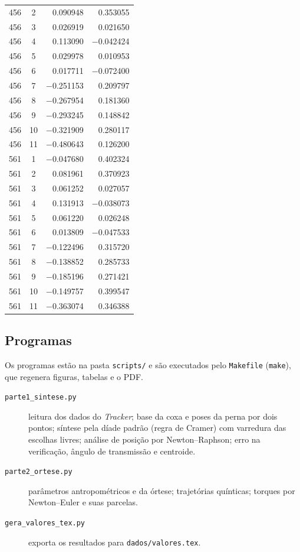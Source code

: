 \documentclass[12pt,a4paper,twoside]{article}
\numberwithin{equation}{section}
\begin{document}
{\begin{longtable}{cc rr}
    456 & 2 & 0.090948 & 0.353055 \\
    456 & 3 & 0.026919 & 0.021650 \\
    456 & 4 & 0.113090 & \ensuremath{-}0.042424 \\
    456 & 5 & 0.029978 & 0.010953 \\
    456 & 6 & 0.017711 & \ensuremath{-}0.072400 \\
    456 & 7 & \ensuremath{-}0.251153 & 0.209797 \\
    456 & 8 & \ensuremath{-}0.267954 & 0.181360 \\
    456 & 9 & \ensuremath{-}0.293245 & 0.148842 \\
    456 & 10 & \ensuremath{-}0.321909 & 0.280117 \\
    456 & 11 & \ensuremath{-}0.480643 & 0.126200 \\
    561 & 1 & \ensuremath{-}0.047680 & 0.402324 \\
    561 & 2 & 0.081961 & 0.370923 \\
    561 & 3 & 0.061252 & 0.027057 \\
    561 & 4 & 0.131913 & \ensuremath{-}0.038073 \\
    561 & 5 & 0.061220 & 0.026248 \\
    561 & 6 & 0.013809 & \ensuremath{-}0.047533 \\
    561 & 7 & \ensuremath{-}0.122496 & 0.315720 \\
    561 & 8 & \ensuremath{-}0.138852 & 0.285733 \\
    561 & 9 & \ensuremath{-}0.185196 & 0.271421 \\
    561 & 10 & \ensuremath{-}0.149757 & 0.399547 \\
    561 & 11 & \ensuremath{-}0.363074 & 0.346388 \\
\end{longtable}
}

\subsection{Programas}\label{ap:codigo}



Os programas estão na pasta \texttt{scripts/} e são executados pelo \texttt{Makefile}
(\texttt{make}), que regenera figuras, tabelas e o PDF.

\begin{description}
  \item[\texttt{parte1\_sintese.py}] leitura dos dados do \emph{Tracker}; base da coxa e poses
  da perna por dois pontos; síntese pela díade padrão (regra de Cramer) com varredura das
  escolhas livres; análise de posição por Newton--Raphson;
  erro na verificação, ângulo de transmissão e centroide.
  \item[\texttt{parte2\_ortese.py}] parâmetros antropométricos e da órtese; trajetórias
  quínticas; torques por Newton--Euler e suas parcelas.
  \item[\texttt{gera\_valores\_tex.py}] exporta os resultados para \texttt{dados/valores.tex}.
\end{description}
\end{document}
